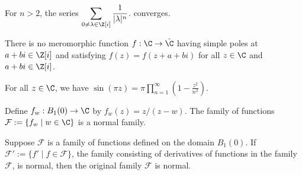 \documentclass{homework}
\begin{document}
\begin{problem}\label{sum-one-over-gaussian-integers}For $n > 2$, the
  series \( \displaystyle\sum_{0 \neq \lambda \in \Z[i]} \frac{1}{|\lambda|^n} \).
  converges.
\end{problem}

\begin{problem}\label{elliptic-more-than-two-poles}There is no meromorphic function $f : \C \to \hat{\C}$ having simple poles at $a+bi \in \Z[i]$ and satisfying $f(z) = f(z+a+bi)$ for all $z \in \C$ and $a+bi \in \Z[i]$.
\end{problem}

\begin{problem}\label{infinite-product-sine}For all $z \in \C$, we have 
  \(
    \sin \left( \pi z \right) = \pi \displaystyle\prod_{n=1}^\infty \left( 1 - \frac{z^2}{n^2} \right)
  \). %
\end{problem}

\begin{problem}\label{normal-family-example}Define
  $f_w : B_1(0) \to \C$ by $f_w(z) = z/(z-w)$.  The family of
  functions $\mathcal{F} := \{ f_w \mid w \in \C \}$ is a normal
  family.
\end{problem}

\begin{problem}\label{derivatives-normal-then-not-normal}Suppose $\mathcal{F}$ is a family of functions defined on the domain $B_1(0)$.  If $\mathcal{F}' := \{ f' \mid f \in \mathcal{F} \}$, the
  family consisting of derivatives of functions in the family
  $\mathcal{F}$, is normal, then the original family $\mathcal{F}$ is
  normal. %
\end{problem}
\end{document}
